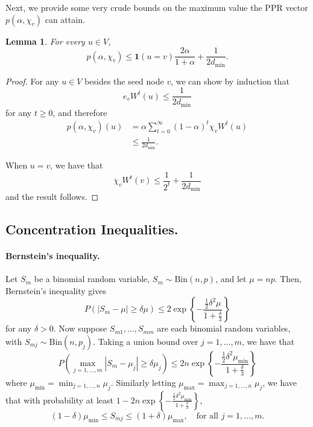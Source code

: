 \documentclass{article}
\newcommand{\abs}[1]{\left \lvert #1 \right \rvert}
\newcommand{\set}[1]{\left\{#1\right\}}
\newcommand{\1}{\mathbf{1}}
\theoremstyle{alden}
\theoremstyle{aldenthm}
\newtheorem{lemma}{Lemma}
\theoremstyle{remark}
\begin{document}
Next, we provide some very crude bounds on the maximum value the PPR vector $p(\alpha,\chi_v)$ can attain.
\begin{lemma}
	\label{lem:crude_ppr_bound}
	For every $u \in V$,
	\begin{equation*}
	p(\alpha,\chi_v) \leq \1(u = v)\frac{2\alpha}{1 + \alpha} + \frac{1}{2d_{\min}}.
	\end{equation*}
\end{lemma}
\begin{proof}
	For any $u \in V$ besides the seed node $v$, we can show by induction that
	\begin{equation*}
	e_v W^t(u) \leq \frac{1}{2 d_{\min}}
	\end{equation*} 
	for any $t \geq 0$, and therefore
	\begin{align*}
	p(\alpha,\chi_v)(u) & = \alpha \sum_{t = 0}^{\infty} (1 - \alpha)^t \chi_v W^t(u) \\
	& \leq  \frac{1}{2d_{\min}}.
	\end{align*}
	
	When $u = v$, we have that 
	\begin{equation*}
	\chi_v W^t(v) \leq \frac{1}{2^t} + \frac{1}{2d_{\min}}
	\end{equation*}
	and the result follows.
\end{proof}

\subsection{Concentration Inequalities.}
\label{subsec:concentration}

\paragraph{Bernstein's inequality.}

Let $S_m$ be a binomial random variable, $S_m \sim \textrm{Bin}(n,p)$, and let $\mu = np$.  Then, Bernstein's inequality gives
\begin{equation*}
P\left(\abs{S_m - \mu} \geq \delta \mu \right) \leq 2 \exp\set{- \frac{\frac{1}{2}\delta^2\mu}{1 + \frac{\delta}{3}}}
\end{equation*}
for any $\delta > 0$. Now suppose $S_{m1},\ldots,S_{mm}$ are each binomial random variables, with $S_{mj} \sim \textrm{Bin}(n,p_j)$. Taking a union bound over $j = 1,\ldots,m$, we have that
\begin{equation*}
P\left(\max_{j = 1,\ldots,m}\abs{S_m - \mu_j} \geq \delta \mu_j \right) \leq 2 n \exp\set{- \frac{\frac{1}{2}\delta^2\mu_{\min}}{1 + \frac{\delta}{3}}} 
\end{equation*}
where $\mu_{\min} = \min_{j = 1,\ldots,n} \mu_j$. Similarly letting $\mu_{\max} = \max_{j = 1,\ldots,n} \mu_j$, we have that with probability at least $1 - 2 n \exp\set{- \frac{\frac{1}{2}\delta^2\mu_{\min}}{1 + \frac{\delta}{3}}}$,
\begin{equation*}
(1 - \delta) \mu_{\min} \leq S_{mj} \leq (1 + \delta) \mu_{\max}, \quad \textrm{for all $j = 1,\ldots,m$.}
\end{equation*}
\end{document}
